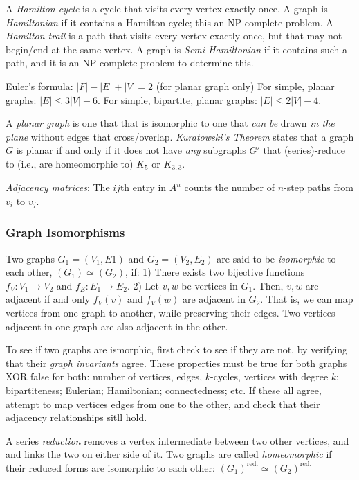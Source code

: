 \documentclass[10pt,letterpaper,twocolumn]{article}
\begin{document}
A \emph{Hamilton cycle} is a cycle that visits
every vertex exactly once. 
A graph is \emph{Hamiltonian} if it contains 
a Hamilton cycle; this an NP-complete problem.
A \emph{Hamilton trail} is a path that visits
every vertex exactly once, but that may not
begin/end at the same vertex. A graph is 
\emph{Semi-Hamiltonian} if it contains such 
a path, and it is an NP-complete problem to 
determine this. 

Euler's formula: $ |F| - |E| + |V| = 2 $ 
(for planar graph only)
For simple, planar graphs: $ |E| \le 3|V| - 6 $.
For simple, bipartite, planar graphs: 
$ |E| \le 2|V| - 4 $.

A \emph{planar graph} is one that that is 
isomorphic to one that \textit{can be} drawn 
\textit{in the plane} without 
edges that cross/overlap. \emph{Kuratowski's Theorem}
states that a graph $ G $ is planar if and only if
it does not have \textit{any} subgraphs $ G' $ 
that (series)-reduce to (i.e., are homeomorphic to)
$ K_5 $ or $ K_{3, 3} $. 

\emph{Adjacency matrices}: 
The $ ij $th entry in $ A^n $ counts the number 
of $ n $-step paths from $ v_i $ to $ v_j $.


\subsubsection{Graph Isomorphisms}

Two graphs $ G_1 = (V_1, E1) $ and 
$ G_2 = (V_2, E_2) $ are said to be 
\emph{isomorphic} to each other,
$ (G_1) \simeq (G_2) $,
if: 1) There exists two bijective functions 
$ f_V: V_1 \rightarrow V_2 $ and 
$ f_E: E_1 \rightarrow E_2 $.
2) Let $ v, w $ be vertices in $ G_1 $. 
Then, $ v, w $ are adjacent if and only 
$ f_V(v) $ and $ f_V(w) $ are adjacent in $ G_2 $.
That is, we can map vertices from one graph 
to another, while preserving their edges. Two 
vertices adjacent in one graph are also adjacent 
in the other.

To see if two graphs are ismorphic, first check to 
see if they are not, by verifying that their
\emph{graph invariants} agree. These properties 
must be true for both graphs XOR false for both: 
number of vertices, edges, $ k $-cycles, vertices
with degree $ k $; bipartiteness; Eulerian; 
Hamiltonian; connectedness; etc. If these all 
agree, attempt to map vertices edges from one 
to the other, and check that their adjacency
relationships sitll hold. 

A series \emph{reduction} removes a vertex
intermediate between two other vertices, and 
and links the two on either side of it. 
Two graphs are called \emph{homeomorphic} if their
reduced forms are isomorphic to each other: 
$ (G_1)^{\textrm{red.}} \simeq (G_2)^{\textrm{red.}} $ 
\end{document}
